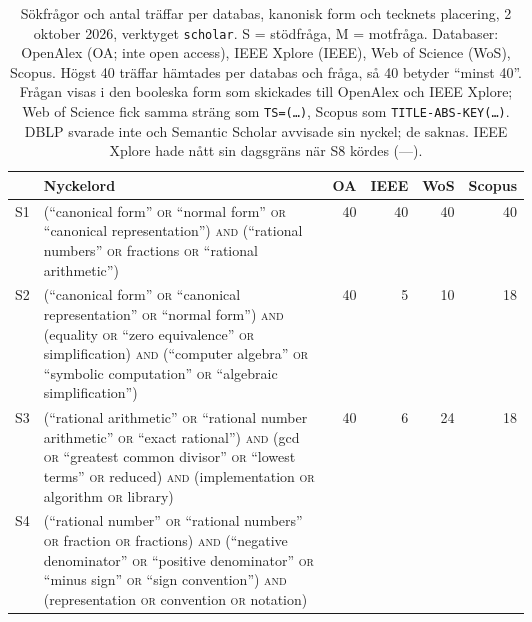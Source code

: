 \begin{table}[!b]
  \caption{Sökfrågor och antal träffar per databas, kanonisk
    form och tecknets placering, 2 oktober 2026, verktyget
    \texttt{scholar}.  S = stödfråga, M = motfråga.  Databaser: OpenAlex
    (OA; inte \foreignlanguage{english}{open access}), IEEE Xplore
    (IEEE), Web of Science (WoS), Scopus.  Högst 40 träffar hämtades per
    databas och fråga, så 40 betyder \enquote{minst 40}.  Frågan visas i
    den booleska form som skickades till OpenAlex och IEEE Xplore; Web
    of Science fick samma sträng som \texttt{TS=(\dots)}, Scopus som
    \texttt{TITLE-ABS-KEY(\dots)}.  DBLP svarade inte och Semantic
    Scholar avvisade sin nyckel; de saknas.  IEEE Xplore hade nått sin
    dagsgräns när S8 kördes (---).}
  \label{tab:sok-queries-kanonisk}
    \centering\scriptsize
    \begin{tabular}{@{}lp{0.6\linewidth}rrrr@{}}
      \toprule
      & Nyckelord & OA & IEEE & WoS & Scopus \\
      \midrule
      S1 & (\enquote{canonical form} \textsc{or} \enquote{normal form} \textsc{or} \enquote{canonical representation}) \textsc{and} (\enquote{rational numbers} \textsc{or} fractions \textsc{or} \enquote{rational arithmetic})
         & 40 & 40 & 40 & 40 \\
      S2 & (\enquote{canonical form} \textsc{or} \enquote{canonical representation} \textsc{or} \enquote{normal form}) \textsc{and} (equality \textsc{or} \enquote{zero equivalence} \textsc{or} simplification) \textsc{and} (\enquote{computer algebra} \textsc{or} \enquote{symbolic computation} \textsc{or} \enquote{algebraic simplification})
         & 40 & 5 & 10 & 18 \\
      S3 & (\enquote{rational arithmetic} \textsc{or} \enquote{rational number arithmetic} \textsc{or} \enquote{exact rational}) \textsc{and} (gcd \textsc{or} \enquote{greatest common divisor} \textsc{or} \enquote{lowest terms} \textsc{or} reduced) \textsc{and} (implementation \textsc{or} algorithm \textsc{or} library)
         & 40 & 6 & 24 & 18 \\
      S4 & (\enquote{rational number} \textsc{or} \enquote{rational numbers} \textsc{or} fraction \textsc{or} fractions) \textsc{and} (\enquote{negative denominator} \textsc{or} \enquote{positive denominator} \textsc{or} \enquote{minus sign} \textsc{or} \enquote{sign convention}) \textsc{and} (representation \textsc{or} convention \textsc{or} notation)

\end{tabular}
\end{table}
